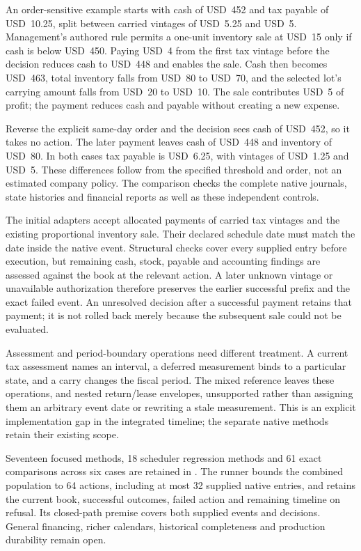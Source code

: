 An order-sensitive example starts with cash of USD~452 and tax payable of
USD~10.25, split between carried vintages of USD~5.25 and USD~5. Management's
authored rule permits a one-unit inventory sale at USD~15 only if cash is below
USD~450. Paying USD~4 from the first tax vintage before the decision reduces
cash to USD~448 and enables the sale. Cash then becomes USD~463, total inventory
falls from USD~80 to USD~70, and the selected lot's carrying amount falls from
USD~20 to USD~10. The sale contributes USD~5 of profit; the payment reduces cash
and payable without creating a new expense.

Reverse the explicit same-day order and the decision sees cash of USD~452,
so it takes no action. The later payment leaves cash of USD~448 and inventory
of USD~80. In both cases tax payable is USD~6.25, with vintages of USD~1.25 and
USD~5. These differences follow from the specified threshold and order, not an
estimated company policy. The comparison checks the complete native journals,
state histories and financial reports as well as these independent controls.

The initial adapters accept allocated payments of carried tax vintages and the
existing proportional inventory sale. Their declared schedule date must match
the date inside the native event. Structural checks cover every supplied entry
before execution, but remaining cash, stock, payable and accounting findings
are assessed against the book at the relevant action. A later unknown vintage
or unavailable authorization therefore preserves the earlier successful prefix
and the exact failed event. An unresolved decision after a successful payment
retains that payment; it is not rolled back merely because the subsequent sale
could not be evaluated.

Assessment and period-boundary operations need different treatment. A current
tax assessment names an interval, a deferred measurement binds to a particular
state, and a carry changes the fiscal period. The mixed reference leaves these
operations, and nested return/lease envelopes, unsupported rather than assigning
them an arbitrary event date or rewriting a stale measurement. This is an
explicit implementation gap in the integrated timeline; the separate native
methods retain their existing scope.

Seventeen focused methods, 18 scheduler regression methods and 61 exact
comparisons across six cases are retained in
. The runner bounds
the combined population to 64 actions, including at most 32 supplied native
entries, and retains the current book, successful outcomes, failed action and
remaining timeline on refusal. Its closed-path premise covers both supplied
events and decisions. General financing, richer calendars, historical
completeness and production durability remain open.


